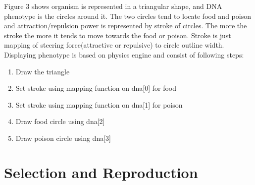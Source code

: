 \documentclass[conference]{IEEEtran}
\begin{document}
Figure 3 shows organism is represented in a triangular shape, and DNA phenotype is the circles around it. The two circles tend to locate food and poison and attraction/repulsion power is represented by stroke of circles. The more the stroke the more it tends to move towards the food or poison. Stroke is just mapping of steering force(attractive or repulsive) to circle outline width. Displaying phenotype is based on physics engine and consist of following steps:
\begin{enumerate}
\item Draw the triangle
\item Set stroke using mapping function on dna[0] for food
\item Set stroke using mapping function on dna[1] for poison
\item Draw food circle using dna[2]
\item Draw poison circle using dna[3]
\end{enumerate}

\section{Selection and Reproduction}
\end{document}
